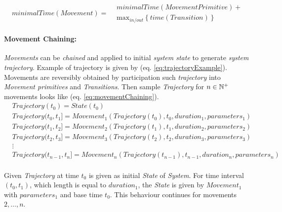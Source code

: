     \begin{equation}\label{eq:minimalMovementTime}
        minimalTime(Movement)=
        \begin{aligned}
        &minimalTime(MovementPrimitive) +\\ &\text{max}_{in/out}\left\{time(Transition)\right\}
        \end{aligned}
    \end{equation}

    \paragraph{Movement Chaining:}\emph{Movements} can be \emph{chained} and applied to initial \emph{system state} to generate \emph{system trajectory}. Example of trajectory is given by (eq. \ref{eq:trajectoryExample}). Movements are reversibly obtained by participation such \emph{trajectory} into \emph{Movement primitives} and \emph{Transitions}. Then sample \emph{Trajectory} for $n\in \mathbb{N}^+$ movements looks like (eq. \ref{eq:movementChaining}).
    \begin{equation}\label{eq:movementChaining}
        \begin{aligned}
        &Trajectory(t_0)=State(t_0)\\
        &Trajectory(t_0,t_1]=Movement_1(Trajectory(t_0),t_0,duration_1,parameters_1)\\
        &Trajectory(t_1,t_2]=Movement_2(Trajectory(t_1),t_1,duration_2,parameters_2)\\
        &Trajectory(t_2,t_3]=Movement_3(Trajectory(t_2),t_2,duration_3,parameters_3)\\
        &\vdots\\
        &Trajectory(t_{n-1},t_n]=Movement_n(Trajectory(t_{n-1}),t_{n-1},duration_n,parameters_n)\\
        \end{aligned}
    \end{equation}

    Given \emph{Trajectory} at time $t_0$ is given as initial \emph{State} of \emph{System}. For time interval $(t_0,t_1)$, which length is equal to $duration_1$, the \emph{State} is given by $Movement_1$ with $parameters_1$ and base time $t_0$. This behaviour continues for movements $2,\dots,n$. 

